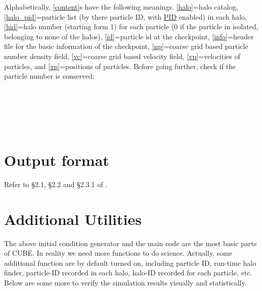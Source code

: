 \documentclass[12pt]{article}
\begin{document}
Alphabetically, \url{[content]}s have the following meanings. \url{[halo]}=halo catalog, \url{[halo_pid]}=particle list (by there particle ID, with \url{PID} enabled) in each halo, \url{[hid]}=halo number (starting form 1) for each particle (0 if the particle in isolated, belonging to none of the halos), \url{[id]}=particle id at the checkpoint, \url{[info]}=header file for the basic information of the checkpoint, \url{[np]}=coarse grid based particle number density field, \url{[vc]}=coarse grid based velocity field, \url{[vp]}=velocities of particles, and \url{[xp]}=positions of particles. Before going further, check if the particle number is conserved:
\\\\
\\
\\
\\
\\


\section{Output format}
Refer to \S 2.1, \S 2.2 and \S 2.3.1 of \cite{2018ApJS..237...24Y}.

\section{Additional Utilities}

The above initial condition generator and the main code are the most basic parts of CUBE. In reality we need more functions to do science. Actually, some additional function are by default turned on, including particle ID, run-time halo finder, particle-ID recorded in each halo, halo-ID recorded for each particle, etc. Below are some more to verify the simulation results visually and statistically. 
\end{document}

